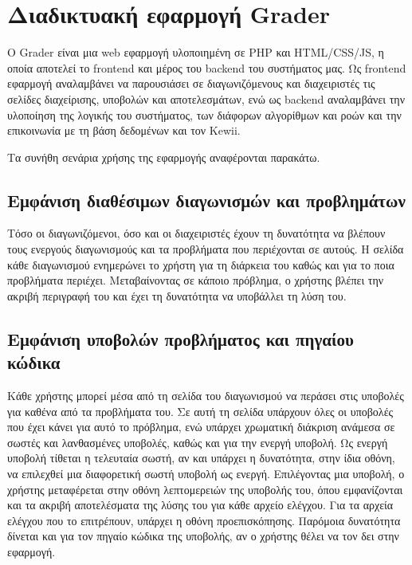 \documentclass[diploma]{softlab-thesis}
\begin{document}
\section{Διαδικτυακή εφαρμογή Grader}

Ο Grader είναι μια web εφαρμογή υλοποιημένη σε PHP και HTML/CSS/JS, η οποία
αποτελεί το frontend και μέρος του backend του συστήματος μας. Ως frontend
εφαρμογή αναλαμβάνει να παρουσιάσει σε διαγωνιζόμενους και διαχειριστές τις
σελίδες διαχείρισης, υποβολών και αποτελεσμάτων, ενώ ως backend αναλαμβάνει την
υλοποίηση της λογικής του συστήματος, των διάφορων αλγορίθμων και ροών και την
επικοινωνία με τη βάση δεδομένων και τον Kewii.

\bigskip

\noindent Τα συνήθη σενάρια χρήσης της εφαρμογής αναφέρονται παρακάτω.

\subsection{Εμφάνιση διαθέσιμων διαγωνισμών και προβλημάτων}

Τόσο οι διαγωνιζόμενοι, όσο και οι διαχειριστές έχουν τη δυνατότητα να βλέπουν
τους ενεργούς διαγωνισμούς και τα προβλήματα που περιέχονται σε αυτούς. Η
σελίδα κάθε διαγωνισμού ενημερώνει το χρήστη για τη διάρκεια του καθώς και για
το ποια προβλήματα περιέχει. Μεταβαίνοντας σε κάποιο πρόβλημα, ο χρήστης βλέπει
την ακριβή περιγραφή του και έχει τη δυνατότητα να υποβάλλει τη λύση του.

\subsection{Εμφάνιση υποβολών προβλήματος και πηγαίου κώδικα}

Κάθε χρήστης μπορεί μέσα από τη σελίδα του διαγωνισμού να περάσει στις υποβολές
για καθένα από τα προβλήματα του. Σε αυτή τη σελίδα υπάρχουν όλες οι υποβολές
που έχει κάνει για αυτό το πρόβλημα, ενώ υπάρχει χρωματική διάκριση ανάμεσα σε
σωστές και λανθασμένες υποβολές, καθώς και για την ενεργή υποβολή. Ως ενεργή
υποβολή τίθεται η τελευταία σωστή, αν και υπάρχει η δυνατότητα, στην ίδια
οθόνη, να επιλεχθεί μια διαφορετική σωστή υποβολή ως ενεργή. Επιλέγοντας μια
υποβολή, ο χρήστης μεταφέρεται στην οθόνη λεπτομερειών της υποβολής του, όπου
εμφανίζονται και τα ακριβή αποτελέσματα της λύσης του για κάθε αρχείο ελέγχου.
Για τα αρχεία ελέγχου που το επιτρέπουν, υπάρχει η οθόνη προεπισκόπησης.
Παρόμοια δυνατότητα δίνεται και για τον πηγαίο κώδικα της υποβολής, αν ο
χρήστης θέλει να τον δει στην εφαρμογή.
\end{document}
